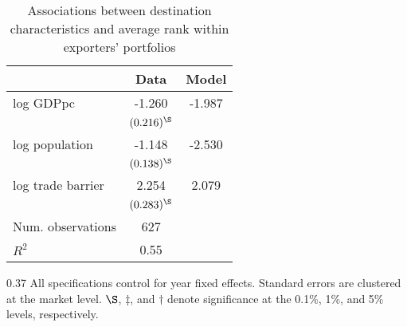 \begin{table}[h!]
\footnotesize
\begin{center}
\caption{Associations between destination characteristics and average rank within exporters' portfolios}
\label{tab:drank_regs}
\begin{tabular}{lcc}\toprule
& Data & Model\\
\midrule
log GDPpc& -1.260& -1.987\\
& $(0.216)^\S$\\[4pt]
log population& -1.148& -2.530\\
& $(0.138)^\S$\\[4pt]
log trade barrier& 2.254& 2.079\\
& $(0.283)^\S$\\[4pt]
Num. observations& 627\\
$R^2$& 0.55\\
\bottomrule
\end{tabular}
\vspace{-0.1cm}
\begin{fignote2}{0.37\textwidth}
All specifications control for year fixed effects. Standard errors are clustered at the market level. $\S$, $\ddagger$, and $\dagger$ denote significance at the 0.1\%, 1\%, and 5\% levels, respectively.
\end{fignote2}
\end{center}
\normalsize
\end{table}
